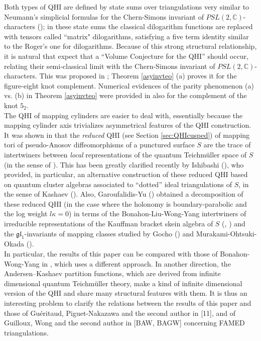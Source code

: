 \documentclass[11pt]{amsart}
\newcommand{\mc}{\mathbb{C}}
\begin{document}
 Both types of QHI are defined by state sums over triangulations very similar to Neumann's simplicial formulas for the Chern-Simons invariant of $PSL(2,\mc)$-characters (\cite{N}); in these state sums the classical dilogarithm functions are replaced with tensors called ``matrix" dilogarithms, satisfying a five term identity similar to the Roger's one for dilogarithms. Because of this strong structural relationship, it is natural that expect that a ``Volume Conjecture for the QHI'' should occur, relating their semi-classical limit with the Chern-Simons invariant of $PSL(2,\mc)$-characters. This was proposed in \cite{KyotoT}; Theorem \ref{asyinvteo} (a) proves it for the figure-eight knot complement. Numerical evidences of the parity phenomenon (a) vs.\!\! (b) in Theorem \ref{asyinvteo} were provided in \cite[Section 9]{AGT} also for the complement of the knot $5_2$.\\
 The QHI of mapping cylinders are easier to deal with, essentially because the mapping cylinder axis trivializes asymmetrical features of the QHI construction. It was shown in \cite{GD} that the {\it reduced} QHI (see Section \ref{sec:QHIcusped}) of mapping tori of pseudo-Anosov diffeomorphisms of a punctured surface $S$ are the trace of intertwiners between {\it local} representations of the quantum Teichm\"uller space of $S$ (in the sense of \cite{B-B-L}). This has been greatly clarified recently by Ishibashi (\cite{Ishibashi}), who provided, in particular, an alternative construction of these reduced QHI based on quantum cluster algebras associated to ``dotted'' ideal triangulations of $S$, in the sense of Kashaev (\cite{KqTeich}). Also, Garoufalidis-Yu (\cite{GY}) obtained a decomposition of 
these reduced QHI (in the case where the holonomy is boundary-parabolic and the log weight $l\kappa=0$) in terms of the Bonahon-Liu-Wong-Yang intertwiners of irreducible representations of the Kauffman bracket skein algebra of $S$ (\cite{B-L}, \cite[Theorem 16]{BWY1}) and the $\mathfrak{gl}_1$-invariants of mapping classes studied by Gocho (\cite{Gocho}) and Murakami-Ohtsuki-Okada (\cite{MOO}).\\ In particular, the results of this paper can be compared with those of Bonahon-Wong-Yang in \cite{BWY2}, which uses a different approach. In another direction, the Andersen--Kashaev \cite{AK} partition functions, which are derived from infinite dimensional quantum Teichm\"uller theory, make a kind of infinite dimensional version of the QHI and share many structural features with them. It is thus an interesting problem to clarify the relations between the results of this paper and those of Guéritaud, Piguet-Nakazawa and the second author in [11], and of Guilloux, Wong and the second author in [BAW, BAGW] concerning FAMED triangulations. 
\end{document}
